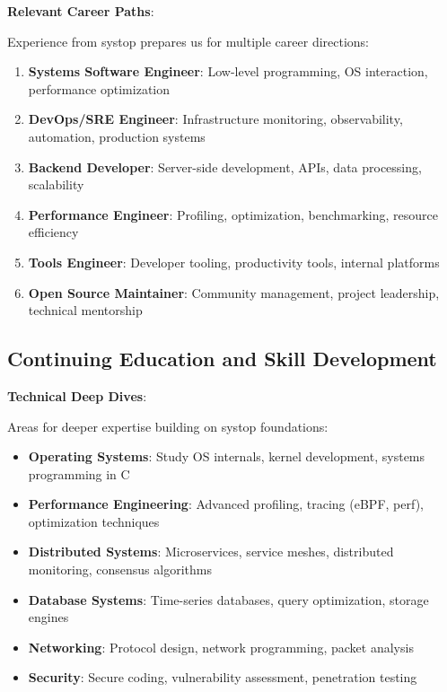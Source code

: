 \documentclass[12pt,a4paper,oneside]{report}
\begin{document}
\textbf{Relevant Career Paths}:

Experience from systop prepares us for multiple career directions:

\begin{enumerate}
    \item \textbf{Systems Software Engineer}: Low-level programming, OS interaction, performance optimization
    \item \textbf{DevOps/SRE Engineer}: Infrastructure monitoring, observability, automation, production systems
    \item \textbf{Backend Developer}: Server-side development, APIs, data processing, scalability
    \item \textbf{Performance Engineer}: Profiling, optimization, benchmarking, resource efficiency
    \item \textbf{Tools Engineer}: Developer tooling, productivity tools, internal platforms
    \item \textbf{Open Source Maintainer}: Community management, project leadership, technical mentorship
\end{enumerate}

\subsection{Continuing Education and Skill Development}

\textbf{Technical Deep Dives}:

Areas for deeper expertise building on systop foundations:

\begin{itemize}
    \item \textbf{Operating Systems}: Study OS internals, kernel development, systems programming in C
    \item \textbf{Performance Engineering}: Advanced profiling, tracing (eBPF, perf), optimization techniques
    \item \textbf{Distributed Systems}: Microservices, service meshes, distributed monitoring, consensus algorithms
    \item \textbf{Database Systems}: Time-series databases, query optimization, storage engines
    \item \textbf{Networking}: Protocol design, network programming, packet analysis
    \item \textbf{Security}: Secure coding, vulnerability assessment, penetration testing
\end{itemize}
\end{document}
